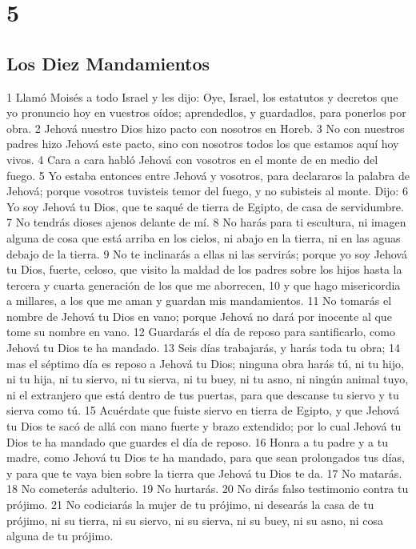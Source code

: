 \chapter{5}

\section{Los Diez Mandamientos }

1 Llamó Moisés a todo Israel y les dijo: Oye, Israel, los estatutos y decretos que yo pronuncio hoy en vuestros oídos; aprendedlos, y guardadlos, para ponerlos por obra.
2 Jehová nuestro Dios hizo pacto con nosotros en Horeb.
3 No con nuestros padres hizo Jehová este pacto, sino con nosotros todos los que estamos aquí hoy vivos.
4 Cara a cara habló Jehová con vosotros en el monte de en medio del fuego.
5 Yo estaba entonces entre Jehová y vosotros, para declararos la palabra de Jehová; porque vosotros tuvisteis temor del fuego, y no subisteis al monte. Dijo:
6 Yo soy Jehová tu Dios, que te saqué de tierra de Egipto, de casa de servidumbre.
7 No tendrás dioses ajenos delante de mí.
8 No harás para ti escultura, ni imagen alguna de cosa que está arriba en los cielos, ni abajo en la tierra, ni en las aguas debajo de la tierra.
9 No te inclinarás a ellas ni las servirás; porque yo soy Jehová tu Dios, fuerte, celoso, que visito la maldad de los padres sobre los hijos hasta la tercera y cuarta generación de los que me aborrecen,
10 y que hago misericordia a millares, a los que me aman y guardan mis mandamientos.
11 No tomarás el nombre de Jehová tu Dios en vano; porque Jehová no dará por inocente al que tome su nombre en vano.
12 Guardarás el día de reposo para santificarlo, como Jehová tu Dios te ha mandado. 
13 Seis días trabajarás, y harás toda tu obra;
14 mas el séptimo día es reposo a Jehová tu Dios; ninguna obra harás tú, ni tu hijo, ni tu hija, ni tu siervo, ni tu sierva, ni tu buey, ni tu asno, ni ningún animal tuyo, ni el extranjero que está dentro de tus puertas, para que descanse tu siervo y tu sierva como tú.
15 Acuérdate que fuiste siervo en tierra de Egipto, y que Jehová tu Dios te sacó de allá con mano fuerte y brazo extendido; por lo cual Jehová tu Dios te ha mandado que guardes el día de reposo.
16 Honra a tu padre y a tu madre, como Jehová tu Dios te ha mandado, para que sean prolongados tus días, y para que te vaya bien sobre la tierra que Jehová tu Dios te da.
17 No matarás. 
18 No cometerás adulterio.
19 No hurtarás. 
20 No dirás falso testimonio contra tu prójimo.
21 No codiciarás la mujer de tu prójimo, ni desearás la casa de tu prójimo, ni su tierra, ni su siervo, ni su sierva, ni su buey, ni su asno, ni cosa alguna de tu prójimo.

